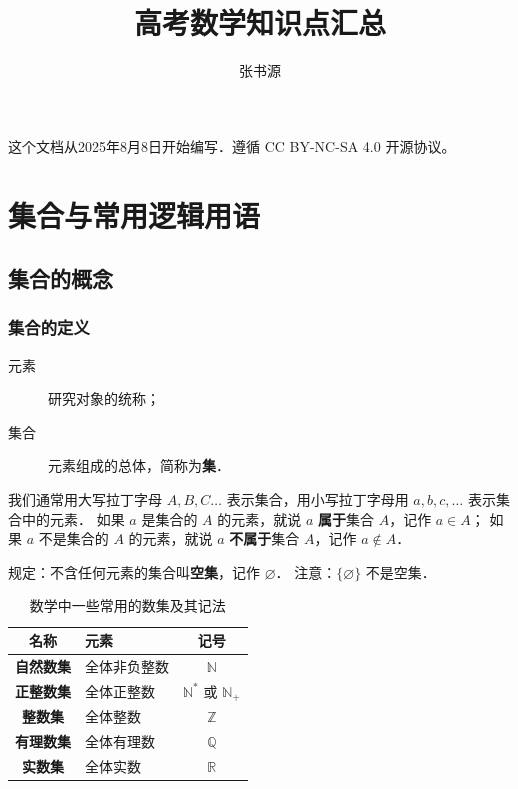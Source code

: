 \documentclass[a4paper,openany]{ctexbook}
\title{高考数学知识点汇总}
\author{张书源}
\begin{document}
\frontmatter
\maketitle
这个文档从2025年8月8日开始编写．遵循 CC BY-NC-SA 4.0 开源协议。
\tableofcontents

\mainmatter

\chapter{集合与常用逻辑用语} %

\section{集合的概念}

\subsection{集合的定义}

\begin{description}
    \item[元素] 研究对象的统称；
    \item[集合] 元素组成的总体，简称为\textbf{集}．
\end{description}

我们通常用大写拉丁字母 \(A,B,C\dots\) 表示集合，用小写拉丁字母用 \(a,b,c,\dots\) 表示集合中的元素．
如果 \(a\) 是集合的 \(A\) 的元素，就说 \(a\) \textbf{属于}集合 \(A\)，记作 \(a \in A\)；
如果 \(a\) 不是集合的 \(A\) 的元素，就说 \(a\) \textbf{不属于}集合 \(A\)，记作 \(a \not\in A\)．

规定：不含任何元素的集合叫\textbf{空集}，记作 \(\varnothing \)．
注意：\(\{\varnothing\}\) 不是空集．

\begin{table}
    \centering
    \begin{tabular}{>{\bfseries}clc}
        \toprule
        \textbf{名称} & \textbf{元素} & \textbf{记号}                        \\
        \midrule
        自然数集      & 全体非负整数  & \(\mathbb{N}\)                       \\
        正整数集      & 全体正整数    & \(\mathbb{N^*}\) 或 \(\mathbb{N_+}\) \\
        整数集        & 全体整数      & \(\mathbb{Z}\)                       \\
        有理数集      & 全体有理数    & \(\mathbb{Q}\)                       \\
        实数集        & 全体实数      & \(\mathbb{R}\)                       \\
        \bottomrule
    \end{tabular}
    \caption{数学中一些常用的数集及其记法}
\end{table}
\end{document}
